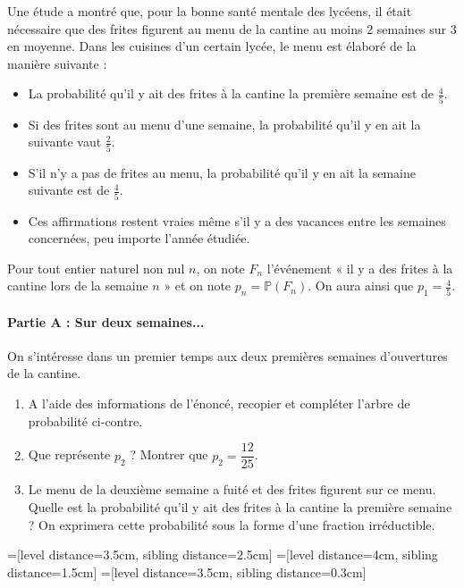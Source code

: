 \documentclass[11pt,fleqn, openany]{book} %
\begin{document}
\begin{exercise}[topic=prob01]
Une étude a montré que, pour la bonne santé mentale des lycéens, il était nécessaire que des frites figurent au menu de la cantine au moins 2 semaines sur 3 en moyenne. Dans les cuisines d'un certain lycée, le menu est élaboré de la manière suivante :
\begin{itemize}
\item La probabilité qu'il y ait des frites à la cantine la première semaine est de $\frac{4}{5}$.
    \item Si des frites sont au menu d'une semaine, la probabilité qu'il y en ait la suivante vaut $\frac{2}{5}$.
    \item S'il n'y a pas de frites au menu, la probabilité qu'il y en ait la semaine suivante est de $\frac{4}{5}$.
    \item Ces affirmations restent vraies même s'il y a des vacances entre les semaines concernées, peu importe l'année étudiée.
\end{itemize}
Pour tout entier naturel non nul $n$, on note $F_n$ l'événement « il y a des frites à la cantine lors de la semaine $n$ » et on note $p_n=\mathbb{P}(F_n)$. On aura ainsi que $p_1=\frac{4}{5}$.

\paragraph{Partie A : Sur deux semaines...}

On s'intéresse dans un premier temps aux deux premières semaines d'ouvertures de la cantine.

\begin{minipage}{0.58\linewidth}\begin{enumerate}
    \item A l'aide des informations de l'énoncé, recopier et compléter l'arbre de probabilité ci-contre.
    
    \item Que représente $p_2$ ? Montrer que $p_2=\dfrac{12}{25}$.
    \item Le menu de la deuxième semaine a fuité et des frites figurent sur ce menu. Quelle est la probabilité qu'il y ait des frites à la cantine la première semaine ? On exprimera cette probabilité sous la forme d'une fraction irréductible.
\end{enumerate} \end{minipage}\begin{minipage}{0.4\linewidth}


=[level distance=3.5cm, sibling distance=2.5cm]
=[level distance=4cm, sibling distance=1.5cm]
=[level distance=3.5cm, sibling distance=0.3cm]


\end{minipage}
\end{exercise}
\end{document}
